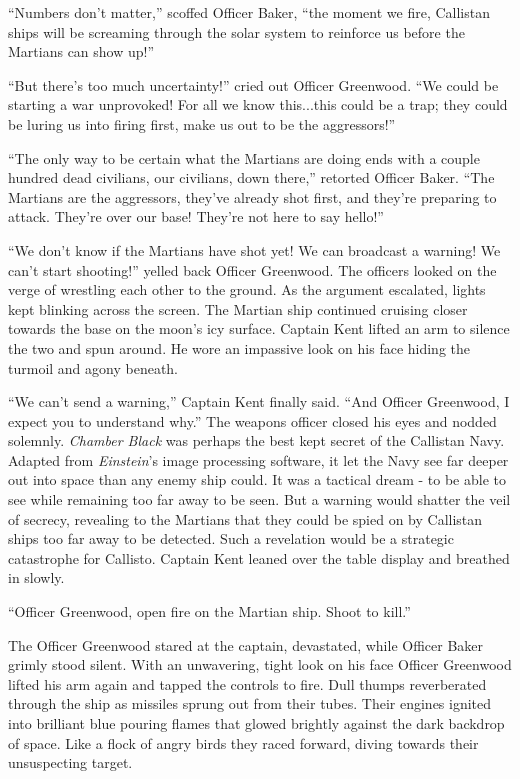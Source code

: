 \documentclass[openany, 12pt]{book} %
\begin{document}
``Numbers don't matter,'' scoffed Officer Baker, ``the moment we fire, Callistan ships will be screaming through the solar system to reinforce us before the Martians can show up!''

``But there's too much uncertainty!'' cried out Officer Greenwood. ``We could be starting a war unprovoked! For all we know this...this could be a trap; they could be luring us into firing first, make us out to be the aggressors!''

``The only way to be certain what the Martians are doing ends with a couple hundred dead civilians, our civilians, down there,'' retorted Officer Baker. ``The Martians are the aggressors, they've already shot first, and they're preparing to attack. They're over our base! They're not here to say hello!''

``We don't know if the Martians have shot yet! We can broadcast a warning! We can't start shooting!'' yelled back Officer Greenwood. The officers looked on the verge of wrestling each other to the ground. As the argument escalated, lights kept blinking across the screen. The Martian ship continued cruising closer towards the base on the moon's icy surface. Captain Kent lifted an arm to silence the two and spun around. He wore an impassive look on his face hiding the turmoil and agony beneath.

``We can't send a warning,'' Captain Kent finally said. ``And Officer Greenwood, I expect you to understand why.'' The weapons officer closed his eyes and nodded solemnly. \textit{Chamber Black} was perhaps the best kept secret of the Callistan Navy. Adapted from \textit{Einstein}'s image processing software, it let the Navy see far deeper out into space than any enemy ship could. It was a tactical dream - to be able to see while remaining too far away to be seen. But a warning would shatter the veil of secrecy, revealing to the Martians that they could be spied on by Callistan ships too far away to be detected. Such a revelation would be a strategic catastrophe for Callisto. Captain Kent leaned over the table display and breathed in slowly.

``Officer Greenwood, open fire on the Martian ship. Shoot to kill.''

The Officer Greenwood stared at the captain, devastated, while Officer Baker grimly stood silent. With an unwavering, tight look on his face Officer Greenwood lifted his arm again and tapped the controls to fire. Dull thumps reverberated through the ship as missiles sprung out from their tubes. Their engines ignited into brilliant blue pouring flames that glowed brightly against the dark backdrop of space. Like a flock of angry birds they raced forward, diving towards their unsuspecting target.
\end{document}
